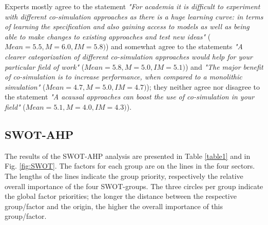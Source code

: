 Experts mostly agree to the statement \textit{"For academia it is difficult to experiment with different co-simulation approaches as there is a huge learning curve: in terms of learning the specification and also gaining access to models as well as being able to make changes to existing approaches and test new ideas"} ($Mean = 5.5, M = 6.0, IM = 5.8)$) and somewhat agree to the statements \textit{"A clearer categorization of different co-simulation approaches would help for your particular field of work"} ($Mean = 5.8, M = 5.0, IM = 5.1)$) and \textit{"The major benefit of co-simulation is to increase performance, when compared to a monolithic simulation"} ($Mean = 4.7, M = 5.0, IM = 4.7)$); they neither agree nor disagree to the statement \textit{"A acausal approaches can boost the use of co-simulation in your field"} ($Mean = 5.1, M = 4.0, IM = 4.3)$).



\subsection{SWOT-AHP}
The results of the SWOT-AHP analysis are presented in Table \ref{table1} and in Fig. \ref{fig:SWOT}. The factors for each group are on the lines in the four sectors. The lengths of the lines indicate the group priority, respectively the relative overall importance of the four SWOT-groups. The three circles per group indicate the global factor priorities; the longer the distance between the respective group/factor and the origin, the higher the overall importance of this group/factor.

